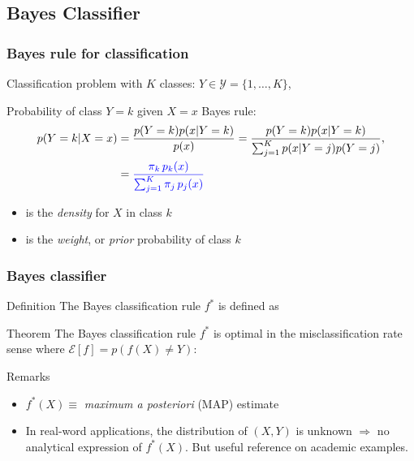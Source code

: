 \subsection{Bayes Classifier}

\begin{frame}
  \frametitle{Bayes rule for classification}
   
   
Classification problem with $K$ classes: $Y \in \mathcal{Y}=\{1,\ldots,K\}$,

\begin{block}{Probability of class $Y=k$ given $X=x$}  
Bayes rule:
  \begin{align*}
 p{(Y=k|X=x)} &=  \frac{ p{(Y=k)}p(x| Y=k) } { p(x) } =
  \frac{p{(Y=k)} p(x| Y=k) } { \sum_{j=1}^K p(x|Y=j)p{(Y=j)}  },\\  
  & = {\textcolor{blue}{ \frac{  \pi_k \,  p_k(x) } { \sum_{j=1}^K  \pi_j \,  p_j(x)   } }}
 \end{align*}
 \begin{itemize}
  \item {} is the {\em density} for $X$ in class $k$
  \item {} is the {\em weight}, or {\em prior} probability of class $k$  
 \end{itemize}
\end{block}

\end{frame}


\begin{frame}
  \frametitle{Bayes classifier}
  
  \begin{block}{Definition}
  The Bayes classification rule $f^{\ast}$ is defined as
   \end{block}
 \begin{block}{Theorem}
 The Bayes classification rule $f^{\ast}$ is optimal in the misclassification rate sense where $\mathcal{E}[f]=p( f(X)  \ne Y)$: 
 \end{block}
  \begin{block}{Remarks}
   \begin{itemize}
    \item $f^{\ast}(X) \equiv$  {\it maximum a posteriori} (MAP) estimate
    \item In real-word applications,  the distribution of $(X,Y)$ is unknown $\Rightarrow$ no analytical expression  of $f^{\ast}(X)$. 
    But useful reference on academic examples.
   \end{itemize}

 \end{block}
\end{frame}




